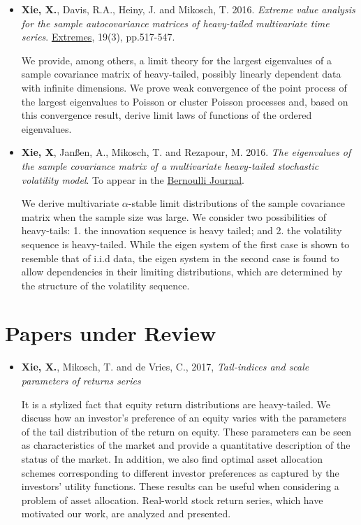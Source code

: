 \documentclass[a4paper]{twentysecondcv} %
\begin{document}
\begin{itemize}
\item {\bf Xie, X.}, Davis, R.A., Heiny, J. and Mikosch, T.
  2016. {\it Extreme value analysis for the sample autocovariance
    matrices of heavy-tailed multivariate time series}.
  \underline{Extremes}, 19(3), pp.517-547.
  
  {\small
  We provide, among others, a limit theory for the largest eigenvalues
  of a sample covariance matrix of heavy-tailed, possibly linearly
  dependent data with infinite dimensions. We prove weak convergence of
  the point process of the largest eigenvalues to Poisson or cluster
  Poisson processes and, based on this convergence result, derive limit
  laws of functions of the ordered eigenvalues.}

\item {\bf Xie, X}, Jan\ss en, A., Mikosch, T. and Rezapour, M.
  2016. {\it The eigenvalues of the sample covariance matrix of a
    multivariate heavy-tailed stochastic volatility model}.
  To appear in the \underline{Bernoulli Journal}.
  
  {\small
  We derive multivariate $\alpha$-stable limit distributions of the
  sample covariance matrix when the sample size was large. We
  consider two possibilities of heavy-tails: 1. the innovation
  sequence is heavy tailed; and 2. the volatility sequence is
  heavy-tailed. While the eigen system of the first case is shown to
  resemble that of i.i.d data, the eigen system in the second case is
  found to allow dependencies in their limiting distributions, which
  are determined by the structure of the volatility sequence.}
\end{itemize}

\section{Papers under Review}
\begin{itemize}
\item {\bf Xie, X.}, Mikosch, T. and de Vries, C., 2017,
  {\it Tail-indices and scale parameters of returns series}

  {\small
    It is a stylized fact that equity return distributions are
    heavy-tailed. We discuss how an investor's preference of an equity
    varies with the parameters of the tail distribution of the return on
    equity. These parameters can be seen as characteristics of the
    market and provide a quantitative description of the status of the
    market.
    In addition, we also find optimal asset allocation schemes
    corresponding to different investor preferences as captured by the
    investors' utility functions. These results can be useful when
    considering a problem of asset allocation. Real-world stock return
    series, which have motivated our work, are analyzed and presented.
  }
\end{itemize}
\end{document}

